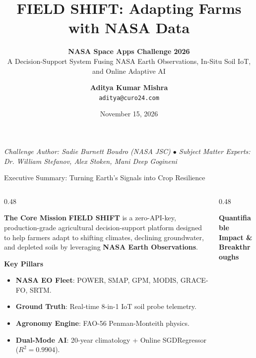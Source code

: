 \documentclass[aspectratio=169,10pt]{beamer}
\title[\textbf{FIELD SHIFT: NASA Decision Intelligence}]{\textbf{\Large FIELD SHIFT: Adapting Farms with NASA Data}}
\subtitle{\textbf{NASA Space Apps Challenge 2026} \\ \small A Decision-Support System Fusing NASA Earth Observations, In-Situ Soil IoT, and Online Adaptive AI}
\author[Team FIELD SHIFT]{\textbf{Aditya Kumar Mishra} \\ \texttt{aditya@curo24.com}}
\institute[NASA Space Apps 2026]{\textbf{NASA Johnson Space Center Earth Science \& Remote Sensing Unit} \\ \href{https://gitlab.com/Aditya99880/field-shift-nasa-2026}{\color{accentcyan}\textbf{GitLab: Aditya99880/field-shift-nasa-2026}}}
\date{November 15, 2026}
\begin{document}
\begin{frame}[plain]
    \titlepage
    \centering
    \vspace{-0.4cm}
    {\scriptsize \textcolor{darkslate}{\textit{Challenge Author: Sadie Burnett Boudro (NASA JSC) $\bullet$ Subject Matter Experts: Dr. William Stefanov, Alex Stoken, Mani Deep Gogineni}}}
\end{frame}

\begin{frame}{Executive Summary: Turning Earth's Signals into Crop Resilience}
    \begin{columns}[T]
        \begin{column}{0.48\textwidth}
            \begin{block}{\textbf{The Core Mission}}
                \small
                \textbf{FIELD SHIFT} is a zero-API-key, production-grade agricultural decision-support platform designed to help farmers adapt to shifting climates, declining groundwater, and depleted soils by leveraging \textbf{NASA Earth Observations}.
            \end{block}
            \vspace{0.1cm}
            \begin{block}{\textbf{Key Pillars}}
                \footnotesize
                \begin{itemize}
                    \item \textbf{NASA EO Fleet}: POWER, SMAP, GPM, MODIS, GRACE-FO, SRTM.
                    \item \textbf{Ground Truth}: Real-time 8-in-1 IoT soil probe telemetry.
                    \item \textbf{Agronomy Engine}: FAO-56 Penman-Monteith physics.
                    \item \textbf{Dual-Mode AI}: 20-year climatology + Online SGDRegressor ($R^2 = 0.9904$).
                \end{itemize}
            \end{block}
        \end{column}
        \begin{column}{0.48\textwidth}
            \begin{exampleblock}{\textbf{Quantifiable Impact \& Breakthroughs}}

\end{exampleblock}
\end{column}
\end{columns}
\end{frame}
\end{document}
